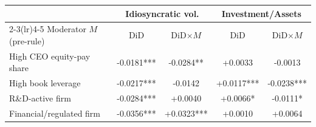 \begin{tabular}{lcccc}
\toprule
& \multicolumn{2}{c}{Idiosyncratic vol.} & \multicolumn{2}{c}{Investment/Assets} \\
\cmidrule(lr){2-3}\cmidrule(lr){4-5}
Moderator $M$ (pre-rule) & DiD & DiD$\times M$ & DiD & DiD$\times M$ \\
\midrule
High CEO equity-pay share & -0.0181*** & -0.0284** & +0.0033 & -0.0013 \\
High book leverage & -0.0217*** & -0.0142 & +0.0117*** & -0.0238*** \\
R\&D-active firm & -0.0284*** & +0.0040 & +0.0066* & -0.0111* \\
Financial/regulated firm & -0.0356*** & +0.0323*** & +0.0010 & +0.0064 \\
\bottomrule
\end{tabular}